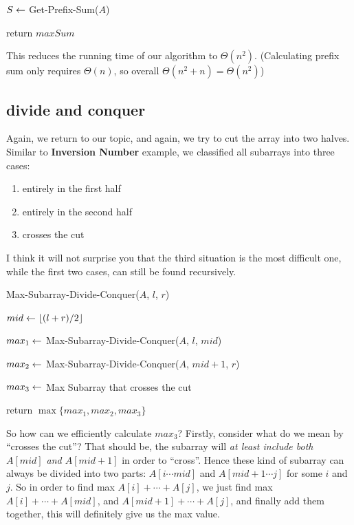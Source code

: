 \begin{spacing}{1.3}
\begin{algorithm}[H]
        $S\leftarrow$ Get-Prefix-Sum($A$) \qquad {}

        return $maxSum$
    \end{algorithm}

    This reduces the running time of our algorithm to $\Theta(n^2)$.
    (Calculating prefix sum only requires $\Theta(n)$, 
    so overall $\Theta(n^2+n)=\Theta(n^2)$)

    \subsection{divide and conquer}

    Again, we return to our topic, and again, we try to cut 
    the array into two halves. Similar to {\bf Inversion Number}
    example, we classified all subarrays into three cases:
    \begin{enumerate}
        \item entirely in the first half
        \item entirely in the second half
        \item crosses the cut
    \end{enumerate}
    I think it will not surprise you that the third situation is 
    the most difficult one, while the first two cases, can still 
    be found recursively.

    \newpage
    \begin{algorithm}[H]
        \caption{Max-Subarray-Divide-Conquer($A$, $l$, $r$)}


        $mid\leftarrow \lfloor (l+r)/2 \rfloor$

        $max_1\leftarrow $ Max-Subarray-Divide-Conquer($A$, $l$, $mid$)

        $max_2\leftarrow $ Max-Subarray-Divide-Conquer($A$, $mid+1$, $r$)

        $max_3\leftarrow $ Max Subarray that crosses the cut

        return $\max \{ max_1, max_2, max_3 \}$
    \end{algorithm}

    So how can we efficiently calculate $max_3$? Firstly, consider 
    what do we mean by ``crosses the cut''? That should be, 
    the subarray will {\it at least include both $A[mid]$ and $A[mid+1]$}
    in order to ``cross''. Hence these kind of subarray can always be 
    divided into two parts: $A[i\cdots mid]$ and $A[mid+1\cdots j]$
    for some $i$ and $j$. So in order to find max $A[i]+\cdots +A[j]$,
    we just find max $A[i]+\cdots +A[mid]$, and $A[mid+1]+\cdots +A[j]$,
    and finally add them together, this will definitely give us 
    the max value.


\end{spacing}
